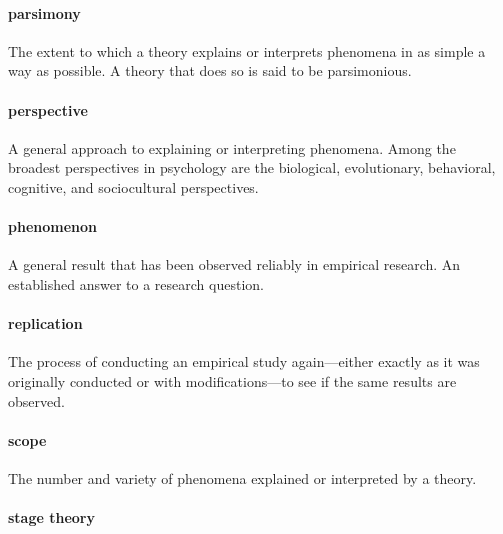 \documentclass[
]{krantz}
\begin{document}
\hypertarget{parsimony}{%
\paragraph*{parsimony}\label{parsimony}}

The extent to which a theory explains or interprets phenomena in as simple a way as possible. A theory that does so is said to be parsimonious.

\hypertarget{perspective}{%
\paragraph*{perspective}\label{perspective}}

A general approach to explaining or interpreting phenomena. Among the broadest perspectives in psychology are the biological, evolutionary, behavioral, cognitive, and sociocultural perspectives.

\hypertarget{phenomenon}{%
\paragraph*{phenomenon}\label{phenomenon}}

A general result that has been observed reliably in empirical research. An established answer to a research question.

\hypertarget{replication}{%
\paragraph*{replication}\label{replication}}

The process of conducting an empirical study again---either exactly as it was originally conducted or with modifications---to see if the same results are observed.

\hypertarget{scope-1}{%
\paragraph*{scope}\label{scope-1}}

The number and variety of phenomena explained or interpreted by a theory.

\hypertarget{stage-theory}{%
\paragraph*{stage theory}\label{stage-theory}}
\end{document}
